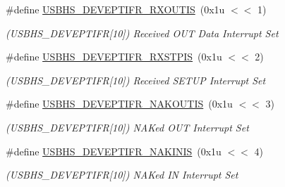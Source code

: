\begin{DoxyCompactItemize}
\mbox{\label{group__SAME70__USBHS_gaef3d6bfad543d172ba059744c175190e}} 
\#define \mbox{\hyperlink{group__SAME70__USBHS_gaef3d6bfad543d172ba059744c175190e}{U\+S\+B\+H\+S\+\_\+\+D\+E\+V\+E\+P\+T\+I\+F\+R\+\_\+\+R\+X\+O\+U\+T\+IS}}~(0x1u $<$$<$ 1)
\begin{DoxyCompactList}\small\item\em (U\+S\+B\+H\+S\+\_\+\+D\+E\+V\+E\+P\+T\+I\+FR\mbox{[}10\mbox{]}) Received O\+UT Data Interrupt Set \end{DoxyCompactList}\item 
\mbox{\label{group__SAME70__USBHS_ga974795f10c7e14d470d001c948a74803}} 
\#define \mbox{\hyperlink{group__SAME70__USBHS_ga974795f10c7e14d470d001c948a74803}{U\+S\+B\+H\+S\+\_\+\+D\+E\+V\+E\+P\+T\+I\+F\+R\+\_\+\+R\+X\+S\+T\+P\+IS}}~(0x1u $<$$<$ 2)
\begin{DoxyCompactList}\small\item\em (U\+S\+B\+H\+S\+\_\+\+D\+E\+V\+E\+P\+T\+I\+FR\mbox{[}10\mbox{]}) Received S\+E\+T\+UP Interrupt Set \end{DoxyCompactList}\item 
\mbox{\label{group__SAME70__USBHS_ga7a7af5d0054bf3e037f35ccc1c952906}} 
\#define \mbox{\hyperlink{group__SAME70__USBHS_ga7a7af5d0054bf3e037f35ccc1c952906}{U\+S\+B\+H\+S\+\_\+\+D\+E\+V\+E\+P\+T\+I\+F\+R\+\_\+\+N\+A\+K\+O\+U\+T\+IS}}~(0x1u $<$$<$ 3)
\begin{DoxyCompactList}\small\item\em (U\+S\+B\+H\+S\+\_\+\+D\+E\+V\+E\+P\+T\+I\+FR\mbox{[}10\mbox{]}) N\+A\+Ked O\+UT Interrupt Set \end{DoxyCompactList}\item 
\mbox{\label{group__SAME70__USBHS_ga053fa6b866c9381fa1de30765cbd3408}} 
\#define \mbox{\hyperlink{group__SAME70__USBHS_ga053fa6b866c9381fa1de30765cbd3408}{U\+S\+B\+H\+S\+\_\+\+D\+E\+V\+E\+P\+T\+I\+F\+R\+\_\+\+N\+A\+K\+I\+N\+IS}}~(0x1u $<$$<$ 4)
\begin{DoxyCompactList}\small\item\em (U\+S\+B\+H\+S\+\_\+\+D\+E\+V\+E\+P\+T\+I\+FR\mbox{[}10\mbox{]}) N\+A\+Ked IN Interrupt Set \end{DoxyCompactList}\item 
\mbox{\label{group__SAME70__USBHS_ga5f6aa026b3b128a93676d9c9d91d18ef}} 

\end{DoxyCompactItemize}

